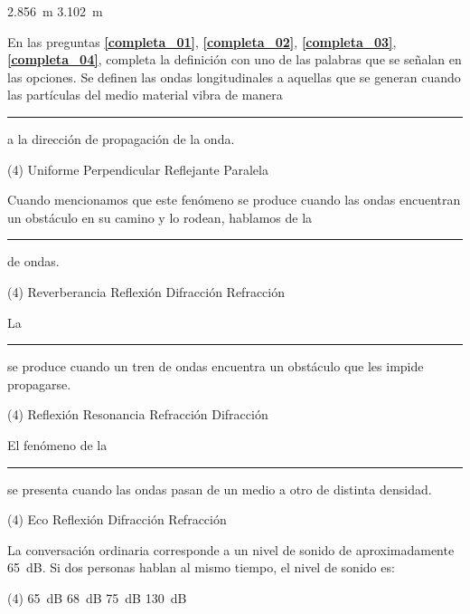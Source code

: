 \documentclass[12pt, letter]{exam}
\begin{document}
\begin{questions}
\begin{tasks}
        \task \SI{2.856}{\meter}
        \task \SI{3.102}{\meter}
        \end{tasks}
    En las preguntas \textbf{\ref{completa_01}}, \textbf{\ref{completa_02}}, \textbf{\ref{completa_03}}, \textbf{\ref{completa_04}}, completa la definición con uno de las palabras que se señalan en las opciones.
    \question \label{completa_01} Se definen las ondas longitudinales a aquellas que se generan cuando las partículas del medio material vibra de manera \rule{2cm}{0.3mm} a la dirección de propagación de la onda.
    \begin{tasks}(4)
        \task Uniforme
        \task Perpendicular
        \task Reflejante
        \task Paralela
    \end{tasks}
    \question \label{completa_02} Cuando mencionamos que este fenómeno se produce cuando las ondas encuentran un obstáculo en su camino y lo rodean, hablamos de la \rule{2cm}{0.3mm} de ondas.
    \begin{tasks}(4)
        \task Reverberancia
        \task Reflexión
        \task Difracción
        \task Refracción
    \end{tasks}
    \question \label{completa_03} La \rule{2cm}{0.3mm} se produce cuando un tren de ondas encuentra un obstáculo que les impide propagarse.
    \begin{tasks}(4)
        \task Reflexión
        \task Resonancia
        \task Refracción
        \task Difracción
    \end{tasks}
    \question \label{completa_04} El fenómeno de la \rule{2cm}{0.3mm} se presenta cuando las ondas pasan de un medio a otro de distinta densidad.
    \begin{tasks}(4)
        \task Eco
        \task Reflexión
        \task Difracción
        \task Refracción
    \end{tasks}
    \question La conversación ordinaria corresponde a un nivel de sonido de aproximadamente \SI{65}{\dB}. Si dos personas hablan al mismo tiempo, el nivel de sonido es:
    \begin{tasks}(4)
        \task \SI{65}{\dB}
        \task \SI{68}{\dB}
        \task \SI{75}{\dB}
        \task \SI{130}{\dB}

\end{tasks}
\end{questions}
\end{document}
